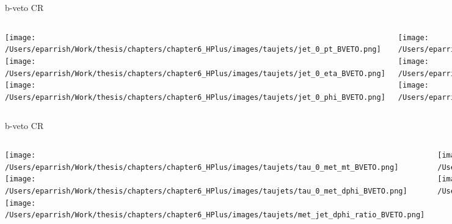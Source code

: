 \documentclass[aspectratio=169,xcolor=table]{beamer}
\begin{document}
    \begin{frame}[t]{b-veto CR}
      \begin{columns}[t]
          \texttt{[image: /Users/eparrish/Work/thesis/chapters/chapter6\_HPlus/images/taujets/jet\_0\_pt\_BVETO.png]}
          \texttt{[image: /Users/eparrish/Work/thesis/chapters/chapter6\_HPlus/images/taujets/jet\_0\_eta\_BVETO.png]}
          \texttt{[image: /Users/eparrish/Work/thesis/chapters/chapter6\_HPlus/images/taujets/jet\_0\_phi\_BVETO.png]}

          \texttt{[image: /Users/eparrish/Work/thesis/chapters/chapter6\_HPlus/images/taujets/jet\_1\_pt\_BVETO.png]}
          \texttt{[image: /Users/eparrish/Work/thesis/chapters/chapter6\_HPlus/images/taujets/jet\_1\_eta\_BVETO.png]}
          \texttt{[image: /Users/eparrish/Work/thesis/chapters/chapter6\_HPlus/images/taujets/jet\_1\_phi\_BVETO.png]}

          \texttt{[image: /Users/eparrish/Work/thesis/chapters/chapter6\_HPlus/images/taujets/jet\_2\_pt\_BVETO.png]}
          \texttt{[image: /Users/eparrish/Work/thesis/chapters/chapter6\_HPlus/images/taujets/jet\_2\_eta\_BVETO.png]}
          \texttt{[image: /Users/eparrish/Work/thesis/chapters/chapter6\_HPlus/images/taujets/jet\_2\_phi\_BVETO.png]}

          \texttt{[image: /Users/eparrish/Work/thesis/chapters/chapter6\_HPlus/images/taujets/effm\_tau\_BVETO.png]}

      \end{columns}
    \end{frame}

    \begin{frame}[t]{b-veto CR}
      \begin{columns}[t]
          \texttt{[image: /Users/eparrish/Work/thesis/chapters/chapter6\_HPlus/images/taujets/tau\_0\_met\_mt\_BVETO.png]}
          \texttt{[image: /Users/eparrish/Work/thesis/chapters/chapter6\_HPlus/images/taujets/tau\_0\_met\_dphi\_BVETO.png]}
          \texttt{[image: /Users/eparrish/Work/thesis/chapters/chapter6\_HPlus/images/taujets/met\_jet\_dphi\_ratio\_BVETO.png]}

          \texttt{[image: /Users/eparrish/Work/thesis/chapters/chapter6\_HPlus/images/taujets/bjet\_0\_met\_dphi\_BVETO.png]}
          \texttt{[image: /Users/eparrish/Work/thesis/chapters/chapter6\_HPlus/images/taujets/bjet\_0\_tau\_0\_dr\_BVETO.png]}



      \end{columns}
    \end{frame}
\end{document}
